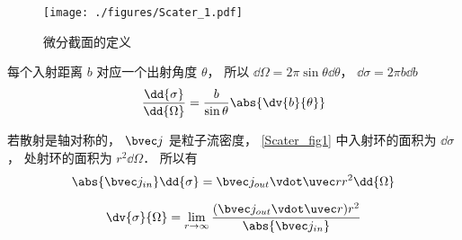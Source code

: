 
\begin{issues}
\issueDraft
\end{issues}



\begin{figure}[ht]
\centering
\texttt{[image: ./figures/Scater\_1.pdf]}
\caption{微分截面的定义} \label{Scater_fig1}
\end{figure}

每个入射距离 $b$ 对应一个出射角度 $\theta$， 所以 $\dd\Omega = 2\pi \sin\theta \dd{\theta}$， $\dd{\sigma} = 2\pi b \dd{b}$
\begin{equation}
\frac{\dd{\sigma}}{\dd{\Omega}} = \frac{b}{\sin\theta} \abs{\dv{b}{\theta}}
\end{equation}

若散射是轴对称的， $\bvec j$ 是粒子流密度， \autoref{Scater_fig1} 中入射环的面积为 $\dd{\sigma}$， 处射环的面积为 $r^2\dd{\Omega}$． 所以有
\begin{equation}
\abs{\bvec j_{in}}\dd{\sigma} = \bvec j_{out} \vdot \uvec r r^2\dd{\Omega}
\end{equation}

\begin{equation}
\dv{\sigma}{\Omega} = \lim_{r\to\infty} \frac{(\bvec j_{out} \vdot \uvec r) r^2}{\abs{\bvec j_{in}}}
\end{equation}
